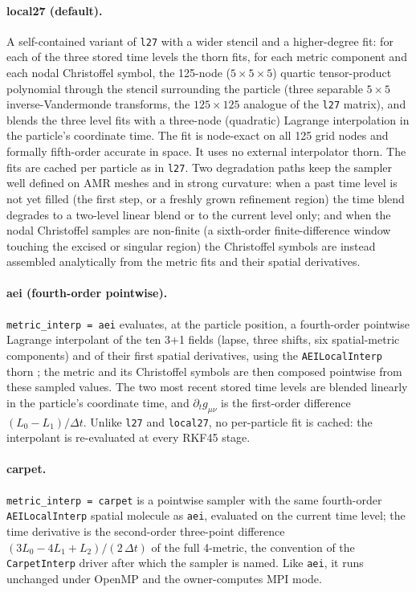 \documentclass[11pt]{article}
\begin{document}
\paragraph{local27 (default).}
A self-contained variant of \texttt{l27} with a wider stencil and a
higher-degree fit: for each of the three stored time
levels the thorn fits, for each metric component and each nodal
Christoffel symbol, the 125-node ($5\times5\times5$) quartic
tensor-product polynomial through the stencil surrounding the particle
(three separable $5\times5$ inverse-Vandermonde transforms, the
$125\times125$ analogue of the \texttt{l27} matrix), and blends the three
level fits with a three-node (quadratic) Lagrange interpolation in the
particle's coordinate time.  The fit is node-exact on all 125 grid nodes
and formally fifth-order accurate in space.  It uses no external
interpolator thorn.  The
fits are cached per particle as in \texttt{l27}.  Two degradation paths
keep the sampler well defined on AMR meshes and in strong curvature: when
a past time level is not yet filled (the first step, or a freshly grown
refinement region) the time blend degrades to a two-level linear blend or
to the current level only; and when the nodal Christoffel samples are
non-finite (a sixth-order finite-difference window touching the excised
or singular region) the Christoffel symbols are instead assembled
analytically from the metric fits and their spatial derivatives.

\paragraph{aei (fourth-order pointwise).}
\texttt{metric\_interp = aei} evaluates, at the particle position, a
fourth-order pointwise Lagrange interpolant of the ten 3+1 fields (lapse,
three shifts, six spatial-metric components) and of their first spatial
derivatives, using the \texttt{AEILocalInterp} thorn
\citep{aeithornguide}; the metric and its Christoffel symbols are then
composed pointwise from these sampled values.  The two most recent stored
time levels are blended linearly in the particle's coordinate time, and
$\partial_t g_{\mu\nu}$ is the first-order difference
$(L_0-L_1)/\Delta t$.  Unlike \texttt{l27} and \texttt{local27}, no
per-particle fit is cached: the interpolant is re-evaluated at every
RKF45 stage.

\paragraph{carpet.}
\texttt{metric\_interp = carpet} is a pointwise sampler with the same
fourth-order \texttt{AEILocalInterp} spatial molecule as \texttt{aei},
evaluated on the current time level; the time derivative is the
second-order three-point difference $(3L_0-4L_1+L_2)/(2\,\Delta t)$ of the
full 4-metric, the convention of the \texttt{CarpetInterp} driver
\citep{carpethornguide} after which the sampler is named.  Like
\texttt{aei}, it runs unchanged under OpenMP and the owner-computes MPI
mode.
\end{document}
